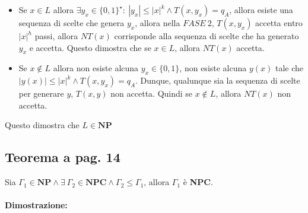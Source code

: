 \begin{itemize}
{        \begin{itemize}
            \item {
                Se $x \in L$ allora $\exists y_{x} \in \{0, 1\}^{\star}:\ |y_{x}| \leq |x|^k \land T(x, y_{x}) = q_{A}$, allora 
                esiste  una sequenza di scelte che genera $y_{x}$, allora nella $FASE\ 2$, $T(x, y_{x})$ accetta entro $|x|^h$ passi, 
                allora $NT(x)$ corrisponde alla sequenza di scelte che ha generato $y_{x}$ e accetta. Questo dimostra che se $x \in L$, allora 
                $NT(x)$ accetta.
            }
            \item {
                Se $x \notin L$ allora non esiste alcuna $y_{x} \in \{0, 1\}$, non esiste alcuna $y(x)$ tale che $|y(x)| \leq |x|^k \land T(x, y_{x}) = q_{A}$.
                Dunque, qualunque sia la sequenza di scelte per generare  $y$, $T(x, y)$ non accetta. Quindi se $x \notin L$, allora $NT(x)$ non accetta. 
            }
        \end{itemize}
    }
\end{itemize}

Questo dimostra che $L \in \textbf{NP}$

\newpage
\subsection{Teorema a pag. 14}

Sia $\Gamma_{1} \in \textbf{NP} \land \exists\ \Gamma_{2} \in \textbf{NPC} \land \Gamma_{2} \leq \Gamma_{1}$, allora 
$\Gamma_{1}$ è \textbf{NPC}.

\paragraph*{Dimostrazione: }

